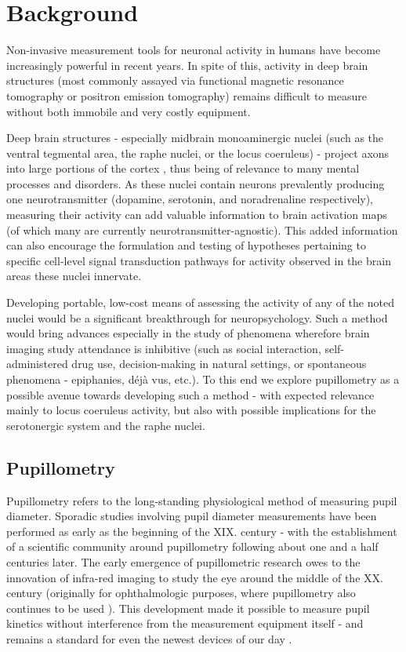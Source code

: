 \chapter{Background}
    Non-invasive measurement tools for neuronal activity in humans have become increasingly powerful in recent years.
    In spite of this, activity in deep brain structures (most commonly assayed via functional magnetic resonance tomography or positron emission tomography) remains difficult to measure without both immobile and very costly equipment.
    
    Deep brain structures - especially midbrain monoaminergic nuclei (such as the ventral tegmental area, the raphe nuclei, or the locus coeruleus) - project axons into large portions of the cortex \citep{vanDomburg1991,Hornung2003,Loughlin1982}, thus being of relevance to many mental processes and disorders.
    As these nuclei contain neurons prevalently producing one neurotransmitter (dopamine, serotonin, and noradrenaline respectively), measuring their activity can add valuable information to brain activation maps (of which many are currently neurotransmitter-agnostic).
    This added information can also encourage the formulation and testing of hypotheses pertaining to specific cell-level signal transduction pathways for activity observed in the brain areas these nuclei innervate.
    
    Developing portable, low-cost means of assessing the activity of any of the noted nuclei would be a significant breakthrough for neuropsychology.
    Such a method would bring advances especially in the study of phenomena wherefore brain imaging study attendance is inhibitive
    (such as social interaction, self-administered drug use, decision-making in natural settings, or spontaneous phenomena - epiphanies, déjà vus, etc.).
    To this end we explore pupillometry as a possible avenue towards developing such a method - with expected relevance mainly to locus coeruleus activity, but also with possible implications for the serotonergic system and the raphe nuclei.
    \section{Pupillometry}\label{sec:b_p}
	Pupillometry refers to the long-standing physiological method of measuring pupil diameter.
	Sporadic studies involving pupil diameter measurements have been performed as early as the beginning of the XIX. century \citep{Loewenfeld1958}-
	with the establishment of a scientific community around pupillometry following about one and a half centuries later.
	The early emergence of pupillometric research owes to the innovation of infra-red imaging to study the eye \citep{Dubois1955} around the middle of the XX. century (originally for ophthalmologic purposes, where pupillometry also continues to be used \citep{Thompson2012}).
	This development made it possible to measure pupil kinetics without interference from the measurement equipment itself - and remains a standard for even the newest devices of our day \citep{Bradley2010}.
	
